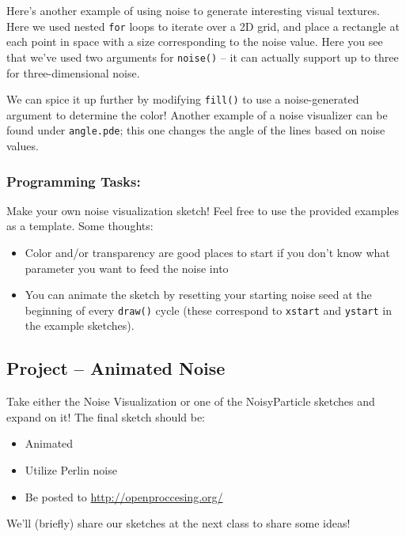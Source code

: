 Here's another example of using noise to generate interesting visual textures.  Here we used nested \texttt{for} loops to iterate over a 2D grid, and place a rectangle at each point in space with a size corresponding to the noise value.  Here you see that we've used two arguments for \texttt{noise()} --  it can actually support up to three for three-dimensional noise.

We can spice it up further by modifying \texttt{fill()} to use a noise-generated argument to determine the color!  Another example of a noise visualizer can be found under \texttt{angle.pde}; this one changes the angle of the lines based on noise values.

\subsubsection{Programming Tasks:}
Make your own noise visualization sketch!  Feel free to use the provided examples as a template.  Some thoughts:

\begin{itemize}
\item Color and/or transparency are good places to start if you don't know what parameter you want to feed the noise into
\item You can animate the sketch by resetting your starting noise seed at the beginning of every \texttt{draw()} cycle (these correspond to \texttt{xstart} and \texttt{ystart} in the example sketches).
\end{itemize}

\subsection{Project -- Animated Noise}
Take either the Noise Visualization or one of the NoisyParticle sketches and expand on it!  The final sketch should be:

\begin{itemize}
\item Animated
\item Utilize Perlin noise
\item Be posted to \url{http://openproccesing.org/}
\end{itemize}

We'll (briefly) share our sketches at the next class to share some ideas!
